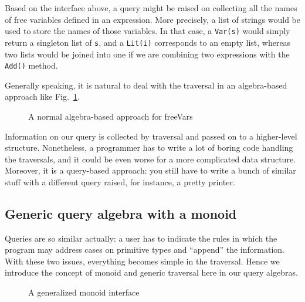 Based on the interface above, a query might be raised on collecting
all the names of free variables defined in an expression. More
precisely, a list of strings would be used to store the names of
those variables. In that case, a \lstinline{Var(s)} would simply return a singleton list of \lstinline{s}, and a \lstinline{Lit(i)} corresponds to an empty list, whereas two lists would be joined into one if we are combining two
expressions with the \lstinline{Add()} method.

Generally speaking, it is natural to deal with the traversal in an algebra-based approach like Fig.~\ref{freevars_without_monoid}.

\begin{figure}[tb]
\vspace{-.1in}
\caption{A normal algebra-based approach for freeVars}
\label{freevars_without_monoid}
\end{figure}
\begin{comment}
\bruno{put code in a figure, add a caption and refer
  to the figure in the text.}
\end{comment}

Information on our query is collected by traversal and passed on to a
higher-level structure. Nonetheless, a programmer has to write a lot
of boring code handling the traversals, and it could be even worse for
a more complicated data structure. Moreover, it is a query-based
approach: you still have to write a bunch of similar stuff with a
different query raised, for instance, a pretty printer.

\subsection{Generic query algebra with a monoid}\label{subsec:genericquery}

Queries are so similar actually: a user has to indicate the rules in
which the program may address cases on primitive types and ``append''
the information. With these two issues, everything becomes simple in
the traversal. Hence we introduce the concept of monoid and generic
traversal here in our query algebras.

\begin{figure}[tb]
\vspace{-.1in}
\caption{A generalized monoid interface}
\label{monoid}
\end{figure}

